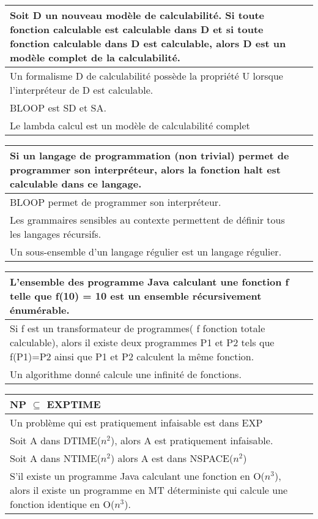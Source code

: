 \documentclass[12pt, a4paper]{article}
\begin{document}
\begin{tabular}{p{13cm}|l}
Soit D un nouveau modèle de calculabilité. Si toute fonction calculable est calculable dans D et si toute fonction calculable dans D est calculable, alors D est un modèle complet de la calculabilité. & \\ \hline
Un formalisme D de calculabilité possède la propriété U lorsque l'interpréteur de D est calculable. & \\ \hline
BLOOP est SD et SA. & \\ \hline
Le lambda calcul est un modèle de calculabilité complet & \\ \hline
\end{tabular}

\begin{tabular}{p{13cm}|l}
Si un langage de programmation (non trivial) permet de programmer son interpréteur, alors la fonction halt est calculable dans ce langage. & \\ \hline
BLOOP permet de programmer son interpréteur. & \\ \hline
Les grammaires sensibles au contexte permettent de définir tous les langages récursifs. & \\ \hline
Un sous-ensemble d'un langage régulier est un langage régulier. & \\ \hline
\end{tabular}

\begin{tabular}{p{13cm}|l}
L'ensemble des programme Java calculant une fonction f telle que f(10) = 10 est un ensemble récursivement énumérable. & \\ \hline
Si f est un transformateur de programmes( f fonction totale calculable), alors il existe deux programmes P1 et P2 tels que f(P1)=P2 ainsi que P1 et P2 calculent la même fonction. & \\ \hline
Un algorithme donné calcule une infinité de fonctions. & \\ \hline
\end{tabular}

\begin{tabular}{p{13cm}|l}
NP $\subseteq$ EXPTIME & \\ \hline
Un problème qui est pratiquement infaisable est dans EXP & \\ \hline
Soit A dans DTIME($n^2$), alors A est pratiquement infaisable. & \\ \hline
Soit A dans NTIME($n^2$) alors A est dans NSPACE($n^2$) & \\ \hline
S'il existe un programme Java calculant une fonction en O($n^3$), alors il existe un programme en MT déterministe qui calcule une fonction identique en O($n^3$).
\end{tabular}
\end{document}
